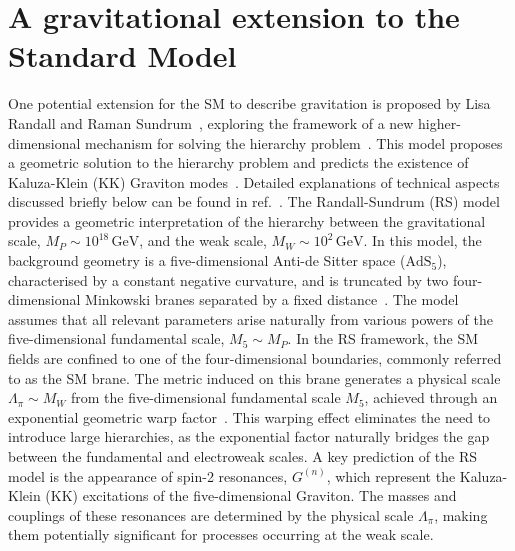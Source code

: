 \section{A gravitational extension to the Standard Model}
        One potential extension for the SM to describe gravitation is proposed by Lisa Randall and Raman Sundrum~\cite{Graviton_theory},
        exploring the framework of a new higher-dimensional mechanism for solving the hierarchy problem~\cite{Arkani_Hamed_1998}.
        This model proposes a geometric solution to the hierarchy problem and predicts the existence of 
        Kaluza-Klein (KK) Graviton modes~\cite{Overduin_1997}. 
        Detailed explanations of technical aspects discussed briefly below can be found in ref.~\cite{Graviton_theory,Arkani_Hamed_1998,Overduin_1997}.
        The Randall-Sundrum (RS) model provides a geometric interpretation of the hierarchy 
        between the gravitational scale, \( M_P \sim 10^{18} \, \text{GeV} \), 
        and the weak scale, \( M_W \sim 10^2 \, \text{GeV} \). 
        In this model, the background geometry is a five-dimensional 
        Anti-de Sitter space (\( \text{AdS}_5 \)), characterised 
        by a constant negative curvature, and is truncated by two 
        four-dimensional Minkowski branes separated by a fixed distance~\cite{Arkani_Hamed_1998}.
        The model assumes that all relevant parameters arise naturally 
        from various powers of the five-dimensional fundamental scale, \( M_5 \sim M_P \).
        In the RS framework, the SM fields are confined to one of 
        the four-dimensional boundaries, commonly referred to as the 
        SM brane. The metric induced on this brane generates a 
        physical scale \( \Lambda_\pi \sim M_W \) from the 
        five-dimensional fundamental scale \( M_5 \), 
        achieved through an exponential geometric warp factor~\cite{Arkani_Hamed_1998}. 
        This warping effect eliminates the need to introduce 
        large hierarchies, as the exponential factor naturally 
        bridges the gap between the fundamental and electroweak scales.
        A key prediction of the RS model is the appearance of 
        spin-2 resonances, \( G^{(n)} \), which represent the 
        Kaluza-Klein (KK) excitations of the five-dimensional Graviton. 
        The masses and couplings of these resonances are determined 
        by the physical scale \( \Lambda_\pi \), making them potentially 
        significant for processes occurring at the weak scale.

